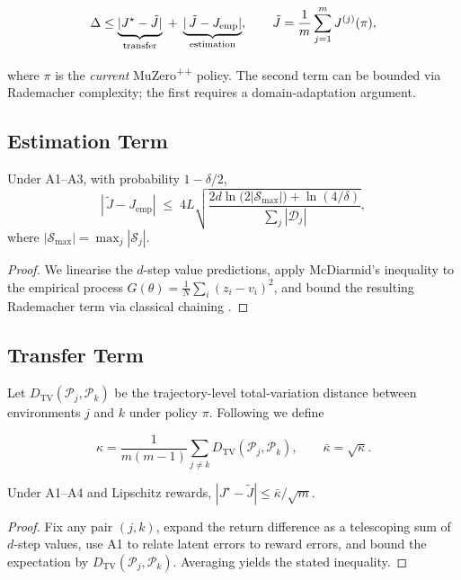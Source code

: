 \begin{equation}
\Delta
\le
\underbrace{\vphantom{\bigl|}%
  |J^\star - \tilde J|
}_{\text{transfer}}
\;+\;
\underbrace{|\,\tilde J - J_{\text{emp}}|}_{\text{estimation}},
\qquad
\tilde J=\frac1m\sum_{j=1}^{m}J^{(j)}(\pi),
\end{equation}

where $\pi$ is the \emph{current} MuZero\textsuperscript{++} policy.  The
second term can be bounded via Rademacher complexity; the first requires a
domain-adaptation argument.

\subsection{Estimation Term}

\begin{lemma}\label{lem:rad}
Under A1–A3, with probability $1-\delta/2$,
\[
|\,\tilde J - J_{\mathrm{emp}}|
\;\le\;
4L
\sqrt{\frac{2d\ln\bigl(2|\mathcal S_{\max}|\bigr)+\ln(4/\delta)}{\sum_j|\mathcal D_j|}},
\]
where $|\mathcal S_{\max}|=\max_j|\mathcal S_j|$.
\end{lemma}

\begin{proof}
We linearise the $d$-step value predictions,
apply McDiarmid’s inequality to the empirical process
$G(\theta)=\frac1N\sum_i(z_i-v_i)^2$, and bound the resulting Rademacher term
via classical chaining \parencite{bartlett2002rademacher}.
\end{proof}

\subsection{Transfer Term}

Let $D_{\text{TV}}(\mathcal P_j,\mathcal P_k)$ be the trajectory-level
total-variation distance between environments $j$ and $k$ under policy $\pi$.
Following \textcite{jiang2015dependence} we define

\[
\kappa
=\frac{1}{m(m-1)}
  \sum_{j\neq k}D_{\text{TV}}(\mathcal P_j,\mathcal P_k),
\qquad
\bar{\kappa}=\sqrt{\kappa}.
\]

\begin{lemma}\label{lem:da}
Under A1–A4 and Lipschitz rewards,  
$|J^\star - \tilde J|\le \bar{\kappa}/\sqrt m$.
\end{lemma}

\begin{proof}
Fix any pair $(j,k)$, expand the return difference as a telescoping sum of
$d$-step values, use A1 to relate latent errors to reward errors, and bound
the expectation by $D_{\text{TV}}(\mathcal P_j,\mathcal P_k)$.  Averaging
yields the stated inequality.
\end{proof}

